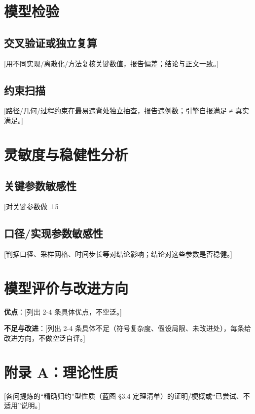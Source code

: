 
\section{模型检验}

\subsection{交叉验证或独立复算}
[用不同实现/离散化/方法复核关键数值，报告偏差；结论与正文一致。]

\subsection{约束扫描}
[路径/几何/过程约束在最易违背处独立抽查，报告违例数；引擎自报满足 ≠ 真实满足。]

\section{灵敏度与稳健性分析}

\subsection{关键参数敏感性}
[对关键参数做 ±5%

\subsection{口径/实现参数敏感性}
[判据口径、采样网格、时间步长等对结论影响；结论对这些参数是否稳健。]

\section{模型评价与改进方向}

\textbf{优点}：[列出 2-4 条具体优点，不空泛。]

\textbf{不足与改进}：[列出 2-4 条具体不足（符号复杂度、假设局限、未改进处），每条给改进方向，不做空泛自评。]

\newpage

\section*{附录 A：理论性质}
[各问提炼的“精确归约”型性质（蓝图 §3.4 定理清单）的证明/梗概或“已尝试、不适用”说明。]

